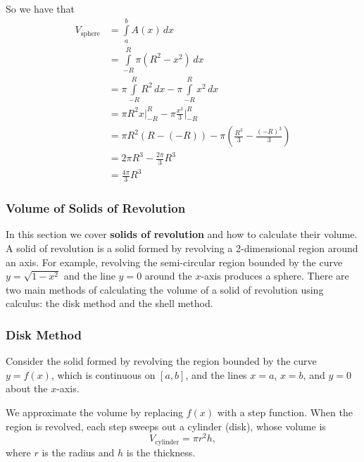 So we have that
\begin{align} V _{\text{sphere}} &= \int\limits_a^b A(x)\,dx \\ &= \int\limits _{-R}^R \pi(R^2-x^2)\,dx \\ &= \pi \int\limits _{-R}^R R^2\,dx - \pi \int\limits _{-R}^R x^2\,dx \\ &= \pi R^2 x \Bigg| _{-R}^R - \pi \frac{x^3}{3} \Bigg| _{-R}^R \\ &= \pi R^2 \left(R - (-R)\right) - \pi \left(\frac{R^3}{3} - \frac{(-R)^3}{3}\right) \\ &= 2\pi R^3 - \frac{2\pi}{3} R^3 \\ &= \frac{4\pi}{3} R^3 \end{align} 


\subsubsection{Volume of Solids of Revolution}
\label{sss:volu-d284}
In this section we cover \textbf{solids of revolution} and how to calculate
their volume. A solid of revolution is a solid formed by revolving a
2-dimensional region around an axis. For example, revolving the semi-circular region bounded by the curve $y=\sqrt{1-x^2}$ and the line $y=0$ around the $x$-axis produces a sphere. There are two main methods of calculating the volume of a solid of revolution using calculus: the disk method and the shell method.


\subsubsection{Disk Method}
\label{sss:disk-f7dd}

Consider the solid formed by revolving the region bounded by the curve 
$y=f(x)$, which is continuous on $[a,b]$, and the lines $x=a$, $x=b$, and $y=0$ 
about the $x$-axis.

\medskip

We approximate the volume by replacing $f(x)$ with a step function. When the 
region is revolved, each step sweeps out a cylinder (disk), whose volume is
\[
V_{\text{cylinder}} = \pi r^2 h,
\]
where $r$ is the radius and $h$ is the thickness.

